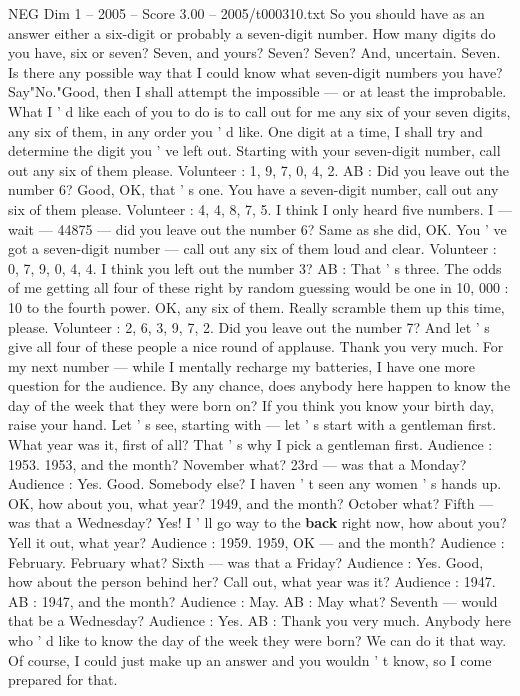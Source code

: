 \begin{textsample}{NEG Dim 1 – 2005 – Score 3.00 – 2005/t000310.txt}
So you should have as an answer either a six-digit or probably a seven-digit number.
How many digits do you have, six or seven?
Seven, and yours?
Seven?
Seven?
And, uncertain.
Seven.
Is there any possible way that I could know what seven-digit numbers you have?
Say"No."Good, then I shall attempt the impossible — or at least the improbable.
What I ' d like each of you to do is to call out for me any six of your seven digits, any six of them, in any order you ' d like.
One digit at a time, I shall try and determine the digit you ' ve left out.
Starting with your seven-digit number, call out any six of them please.
Volunteer : 1, 9, 7, 0, 4, 2.
AB : Did you leave out the number 6?
Good, OK, that ' s one.
You have a seven-digit number, call out any six of them please.
Volunteer : 4, 4, 8, 7, 5.
I think I only heard five numbers.
I — wait — 44875 — did you leave out the number 6?
Same as she did, OK.
You ' ve got a seven-digit number — call out any six of them loud and clear.
Volunteer : 0, 7, 9, 0, 4, 4.
I think you left out the number 3?
AB : That ' s three.
The odds of me getting all four of these right by random guessing would be one in 10, 000 : 10 to the fourth power.
OK, any six of them.
Really scramble them up this time, please.
Volunteer : 2, 6, 3, 9, 7, 2.
Did you leave out the number 7?
And let ' s give all four of these people a nice round of applause.
Thank you very much.
For my next number — while I mentally recharge my batteries, I have one more question for the audience.
By any chance, does anybody here happen to know the day of the week that they were born on?
If you think you know your birth day, raise your hand.
Let ' s see, starting with — let ' s start with a gentleman first.
What year was it, first of all?
That ' s why I pick a gentleman first.
Audience : 1953. 1953, and the month?
November what? 23rd — was that a Monday?
Audience : Yes.
Good.
Somebody else?
I haven ' t seen any women ' s hands up.
OK, how about you, what year? 1949, and the month?
October what?
Fifth — was that a Wednesday?
Yes!
I ' ll go way to the \textbf{back} right now, how about you?
Yell it out, what year?
Audience : 1959. 1959, OK — and the month?
Audience : February.
February what?
Sixth — was that a Friday?
Audience : Yes.
Good, how about the person behind her?
Call out, what year was it?
Audience : 1947.
AB : 1947, and the month?
Audience : May.
AB : May what?
Seventh — would that be a Wednesday?
Audience : Yes.
AB : Thank you very much.
Anybody here who ' d like to know the day of the week they were born?
We can do it that way.
Of course, I could just make up an answer and you wouldn ' t know, so I come prepared for that.

\end{textsample}
